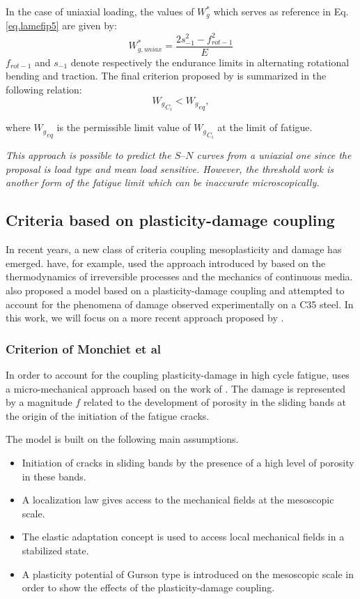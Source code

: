 In the case of uniaxial loading, the values of $W_g^*$ which serves as reference in Eq.\eqref{eq.lamefip5} are given by:
$$W^*_{g,uniax}=\dfrac{2s_{-1}^2-f_{rot-1}^2}{E}$$
$f_{rot-1}$ and $s_{-1}$ denote respectively the endurance limits in alternating rotational bending and traction.
The final criterion proposed by \cite{banvillet2003volumetric} is summarized in the following relation:
$${W_g}_{C_i}<{W_g}_{eq},$$

where ${W_g}_{eq}$ is the permissible limit value of ${W_g}_{C_i}$  at the limit of fatigue.

\textit{This approach is possible to predict the $S–N$ curves from
	a uniaxial one since the proposal is load type and mean
	load sensitive. However, the threshold work is another form of the fatigue limit which can be inaccurate microscopically.}

\subsection{Criteria based on plasticity-damage coupling}
In recent years, a new class of criteria coupling mesoplasticity and damage has emerged.  \cite{lemaitre1999two} have, for example, used the approach introduced by \cite{lemaitre1985mecanique} based on the thermodynamics of irreversible processes and the mechanics of continuous media.  \cite{flaceliere2004contribution} also proposed a model based on a plasticity-damage coupling and attempted to account for the phenomena of damage observed experimentally on a C35 steel. In this work, we will focus on a more recent approach proposed by \cite{monchiet2006contributions}.
\subsubsection{Criterion of Monchiet et al}
In order to account for the coupling plasticity-damage in high cycle fatigue, \cite{monchiet2006contributions} uses a micro-mechanical approach based on the work of  \cite{gurson1977continuum}. The damage is represented by a magnitude $f$ related to the development of porosity in the sliding bands at the origin of the initiation of the fatigue cracks. 

The model  is built on the following main assumptions. 

\begin{itemize}
	\item  Initiation of cracks in sliding bands by the presence of a high level of porosity in these bands.
	\item A localization law gives access to the mechanical fields at the mesoscopic scale.
	\item The elastic adaptation concept is used to access local mechanical fields in a stabilized state.
	\item A plasticity potential of Gurson type is introduced on the mesoscopic scale in order to show the effects of the plasticity-damage coupling.
\end{itemize}

